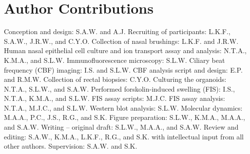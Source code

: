 \section{Author Contributions}
Conception and design: S.A.W. and A.J. Recruiting of participants: L.K.F., S.A.W., J.R.W., and C.Y.O. Collection of nasal brushings: L.K.F. and J.R.W. Human nasal epithelial cell culture and ion transport assay and analysis: N.T.A., K.M.A., and S.L.W. Immunofluorescence microscopy: S.L.W. Ciliary beat frequency (CBF) imaging: I.S. and S.L.W. CBF analysis script and design: E.P. and R.M.W. Collection of rectal biopsies: C.Y.O. Culturing the organoids: N.T.A., S.L.W., and S.A.W. Performed forskolin-induced swelling (FIS): I.S., N.T.A., K.M.A., and S.L.W. FIS assay scripts: M.J.C. FIS assay analysis: N.T.A., M.J.C., and S.L.W. Western blot analysis: S.L.W. Molecular dynamics: M.A.A., P.C., J.S., R.G., and S.K. Figure preparation: S.L.W., K.M.A., M.A.A., and S.A.W. Writing – original draft: S.L.W., M.A.A., and S.A.W. Review and editing: S.A.W., K.M.A., L.K.F., R.G., and S.K. with intellectual input from all other authors. Supervision: S.A.W. and S.K.
